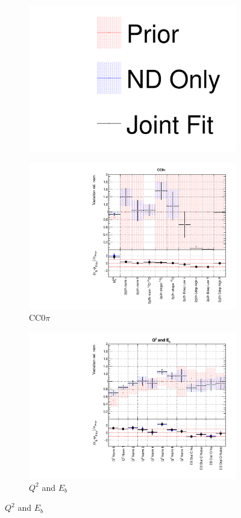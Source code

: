 \begin{figure}
\centering
\begin{subfigure}{0.95\textwidth}
  \centering
  \includegraphics[width=0.25\linewidth]{figs/joint_leg}
\end{subfigure}
\begin{subfigure}{0.49\textwidth}
  \centering
  \includegraphics[width=0.9\linewidth]{figs/jointxsec1}
  \caption{CC0$\pi$}
\end{subfigure}
\begin{subfigure}{0.49\textwidth}
  \centering
  \includegraphics[width=0.9\linewidth]{figs/jointxsec2}
  \caption{$Q^2$ and $E_b$}
\end{subfigure}

\end{figure}
